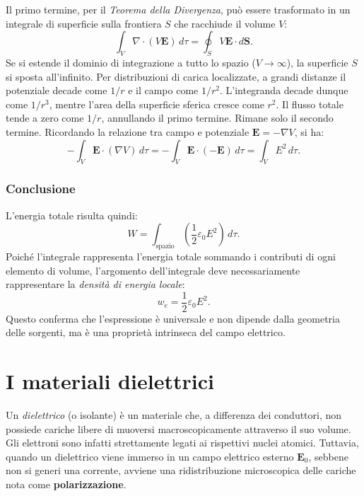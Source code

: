 \documentclass[a4paper,11pt]{report}
\begin{document}
\begin{approfondimento}[colback= white, colframe=green!35!black, no shadow, title={Validità generale della densità di energia elettrostatica}]
Il primo termine, per il \textit{Teorema della Divergenza}, può essere trasformato in un integrale di superficie sulla frontiera $S$ che racchiude il volume $V$:
\begin{equation}
    \int_V \nabla \cdot (V \bm{E}) \, d\tau = \oint_S V \bm{E} \cdot d\bm{S}.
\end{equation}
Se si estende il dominio di integrazione a tutto lo spazio ($V \to \infty$), la superficie $S$ si sposta all'infinito. Per distribuzioni di carica localizzate, a grandi distanze il potenziale decade come $1/r$ e il campo come $1/r^2$. L'integranda decade dunque come $1/r^3$, mentre l'area della superficie sferica cresce come $r^2$. Il flusso totale tende a zero come $1/r$, annullando il primo termine.
Rimane solo il secondo termine. Ricordando la relazione tra campo e potenziale $\bm{E} = -\nabla V$, si ha:
\begin{equation}
    - \int_V \bm{E} \cdot (\nabla V) \, d\tau = - \int_V \bm{E} \cdot (-\bm{E}) \, d\tau = \int_V E^2 \, d\tau.
\end{equation}

\subsubsection{Conclusione}
L'energia totale risulta quindi:
\begin{equation}
    W = \int_{\text{spazio}} \left( \frac{1}{2} \varepsilon_0 E^2 \right) \, d\tau.
\end{equation}
Poiché l'integrale rappresenta l'energia totale sommando i contributi di ogni elemento di volume, l'argomento dell'integrale deve necessariamente rappresentare la \textit{densità di energia locale}:
\begin{equation}
    w_e = \frac{1}{2} \varepsilon_0 E^2.
\end{equation}
Questo conferma che l'espressione è universale e non dipende dalla geometria delle sorgenti, ma è una proprietà intrinseca del campo elettrico.
\end{approfondimento}







\section{I materiali dielettrici}

Un \textit{dielettrico} (o isolante) è un materiale che, a differenza dei conduttori, non possiede cariche libere di muoversi macroscopicamente attraverso il suo volume. Gli elettroni sono infatti strettamente legati ai rispettivi nuclei atomici.
Tuttavia, quando un dielettrico viene immerso in un campo elettrico esterno $\bm{E}_0$, sebbene non si generi una corrente, avviene una ridistribuzione microscopica delle cariche nota come \textbf{polarizzazione}.
\end{document}
